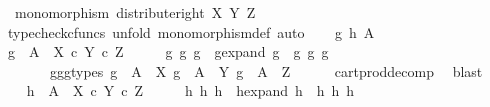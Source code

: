 \begin{isabellebody}
\ \ {\isachardoublequoteopen}monomorphism\ {\isacharparenleft}{\kern0pt}distribute{\isacharunderscore}{\kern0pt}right\ X\ Y\ Z{\isacharparenright}{\kern0pt}{\isachardoublequoteclose}\isanewline
%
\isadelimproof
%
\endisadelimproof
%
\isatagproof
{}\isamarkupfalse%
\ {\isacharparenleft}{\kern0pt}typecheck{\isacharunderscore}{\kern0pt}cfuncs{\isacharcomma}{\kern0pt}\ unfold\ monomorphism{\isacharunderscore}{\kern0pt}def{}{\isacharcomma}{\kern0pt}\ auto{\isacharparenright}{\kern0pt}\isanewline
\ \ \isamarkupfalse%
\ g\ h\ A\isanewline
\ \ \isamarkupfalse%
\ {\isachardoublequoteopen}g\ {\isacharcolon}{\kern0pt}\ A\ {\isasymrightarrow}\ {\isacharparenleft}{\kern0pt}X\ {\isasymtimes}\isactrlsub c\ Y{\isacharparenright}{\kern0pt}\ {\isasymtimes}\isactrlsub c\ Z{\isachardoublequoteclose}\isanewline
\ \ \isamarkupfalse%
\ \isamarkupfalse%
\ g{}\ g{}\ g{}\ \ g{\isacharunderscore}{\kern0pt}expand{\isacharcolon}{\kern0pt}\ {\isachardoublequoteopen}g\ {\isacharequal}{\kern0pt}\ {\isasymlangle}{\isasymlangle}g{}{\isacharcomma}{\kern0pt}\ g{}{\isasymrangle}{\isacharcomma}{\kern0pt}\ g{}{\isasymrangle}{\isachardoublequoteclose}\isanewline
\ \ \ \ \ \ \ g{}{\isacharunderscore}{\kern0pt}g{}{\isacharunderscore}{\kern0pt}g{}{\isacharunderscore}{\kern0pt}types{\isacharcolon}{\kern0pt}\ {\isachardoublequoteopen}g{}\ {\isacharcolon}{\kern0pt}\ A\ {\isasymrightarrow}\ X{\isachardoublequoteclose}\ {\isachardoublequoteopen}g{}\ {\isacharcolon}{\kern0pt}\ A\ {\isasymrightarrow}\ Y{\isachardoublequoteclose}\ {\isachardoublequoteopen}g{}\ {\isacharcolon}{\kern0pt}\ A\ {\isasymrightarrow}\ Z{\isachardoublequoteclose}\isanewline
\ \ \ \ \isamarkupfalse%
\ cart{\isacharunderscore}{\kern0pt}prod{\isacharunderscore}{\kern0pt}decomp\ \isamarkupfalse%
\ blast\ \isanewline
\ \ \isamarkupfalse%
\ {\isachardoublequoteopen}h\ {\isacharcolon}{\kern0pt}\ A\ {\isasymrightarrow}\ {\isacharparenleft}{\kern0pt}X\ {\isasymtimes}\isactrlsub c\ Y{\isacharparenright}{\kern0pt}\ {\isasymtimes}\isactrlsub c\ Z{\isachardoublequoteclose}\isanewline
\ \ \isamarkupfalse%
\ \isamarkupfalse%
\ h{}\ h{}\ h{}\ \ h{\isacharunderscore}{\kern0pt}expand{\isacharcolon}{\kern0pt}\ {\isachardoublequoteopen}h\ {\isacharequal}{\kern0pt}\ {\isasymlangle}{\isasymlangle}h{}{\isacharcomma}{\kern0pt}\ h{}{\isasymrangle}{\isacharcomma}{\kern0pt}\ h{}{\isasymrangle}{\isachardoublequoteclose}\isanewline

\end{isabellebody}
